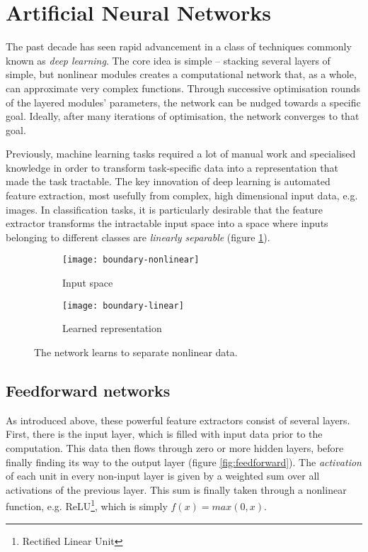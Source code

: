 \documentclass[../../report.tex]{subfiles}
\begin{document}
\section{Artificial Neural Networks}

The past decade has seen rapid advancement in a class of techniques commonly
known as \emph{deep learning}. The core idea is simple -- stacking several
layers of simple, but nonlinear modules creates a computational network that, as
a whole, can approximate very complex functions. Through successive optimisation
rounds of the layered modules' parameters, the network can be nudged towards a
specific goal. Ideally, after many iterations of optimisation, the network
converges to that goal.

Previously, machine learning tasks required a lot of manual work and specialised
knowledge in order to transform task-specific data into a representation that
made the task tractable. The key innovation of deep learning is automated
feature extraction, most usefully from complex, high dimensional input data,
e.g. images. In classification tasks, it is particularly desirable that the
feature extractor transforms the intractable input space into a space where
inputs belonging to different classes are \emph{linearly separable} (figure
\ref{fig:representation-learning}). \cite{LeCun2015}

\begin{figure}
  \centering
  \begin{subfigure}[b]{0.49\textwidth}
    \centering
    \texttt{[image: boundary-nonlinear]}
    \caption{Input space}
  \end{subfigure}
  \hfill
  \begin{subfigure}[b]{0.49\textwidth}
    \centering
    \texttt{[image: boundary-linear]}
    \caption{Learned representation}
  \end{subfigure}
  \caption{The network learns to separate nonlinear data. \cite{Olah2014}}
  \label{fig:representation-learning}
\end{figure}

\subsection{Feedforward networks}

As introduced above, these powerful feature extractors consist of several
layers. First, there is the input layer, which is filled with input data prior
to the computation. This data then flows through zero or more hidden layers,
before finally finding its way to the output layer (figure
\ref{fig:feedforward}). The \emph{activation} of each unit in every non-input
layer is given by a weighted sum over all activations of the previous layer.
This sum is finally taken through a nonlinear function, e.g.
ReLU\footnote{Rectified Linear Unit}, which is simply \(f(x) = max(0, x)\).
\end{document}
